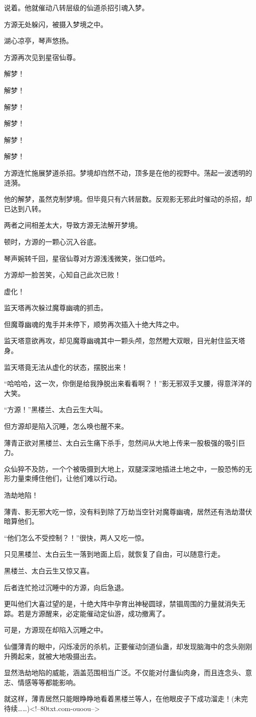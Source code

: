 \begin{this_body}
说着。他就催动八转层级的仙道杀招引魂入梦。

方源无处躲闪，被摄入梦境之中。

湖心凉亭，琴声悠扬。

方源再次见到星宿仙尊。

解梦！

解梦！

解梦！

解梦！

解梦！

解梦！

方源连忙施展梦道杀招。梦境却岿然不动，顶多是在他的视野中。荡起一波透明的涟漪。

他的解梦，虽然克制梦境。但毕竟只有六转层数。反观影无邪此时催动的杀招，却已达到八转。

两者之间相差太大，导致方源无法解开梦境。

顿时，方源的一颗心沉入谷底。

琴声婉转千回，星宿仙尊对方源浅浅微笑，张口低吟。

方源却一脸苦笑，心知自己此次已败！

虚化！

监天塔再次躲过魔尊幽魂的抓击。

但魔尊幽魂的鬼手并未停下，顺势再次插入十绝大阵之中。

监天塔意欲再攻，却见魔尊幽魂其中一颗头颅，忽然瞪大双眼，目光射住监天塔身。

监天塔竟无法从虚化的状态，摆脱出来！

“哈哈哈，这一次，你倒是给我挣脱出来看看啊？！”影无邪双手叉腰，得意洋洋的大笑。

“方源！”黑楼兰、太白云生大叫。

但方源却是陷入沉睡，怎么唤也醒不来。

薄青正欲对黑楼兰、太白云生痛下杀手，忽然间从大地上传来一股极强的吸引巨力。

众仙猝不及防，一个个被吸摄到大地上，双腿深深地插进土地之中，一股恐怖的无形力量束缚住他们，让他们难以行动。

浩劫地陷！

薄青、影无邪大吃一惊，没有料到除了万劫当空针对魔尊幽魂，居然还有浩劫潜伏暗算他们。

“他们怎么不受控制？！”很快，两人又吃一惊。

只见黑楼兰、太白云生一落到地面上后，就恢复了自由，可以随意行走。

黑楼兰、太白云生又惊又喜。

后者连忙抢过沉睡中的方源，向后急退。

更叫他们大喜过望的是，十绝大阵中孕育出神秘圆球，禁锢周围的力量就消失无踪。若是方源醒来，必定能催动定仙游，成功撤离了。

可是，方源现在却陷入沉睡之中。

仙僵薄青的眼中，闪烁凌厉的杀机，正要催动剑道仙蛊，却发现脑海中的念头刚刚升腾起来，就被大地吸摄出去。

显然浩劫地陷的威能，涵盖范围相当广泛。不仅能对付蛊仙肉身，而且连念头、意志、情感等等都能影响。

就这样，薄青居然只能眼睁睁地看着黑楼兰等人，在他眼皮子下成功溜走！(未完待续……)<!--80txt.com-ouoou-->

\end{this_body}

